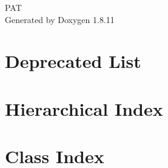 \documentclass[twoside]{book}
\newcommand{\+}{\discretionary{\mbox{\scriptsize$\hookleftarrow$}}{}{}}
\newcommand{\clearemptydoublepage}{%
  \newpage{\pagestyle{empty}\cleardoublepage}%
}
\begin{document}
\hypersetup{pageanchor=false,
             bookmarksnumbered=true,
             pdfencoding=unicode
            }
\begin{titlepage}
\vspace*{7cm}
\begin{center}%
{\Large P\+AT }\\
\vspace*{1cm}
{\large Generated by Doxygen 1.8.11}\\
\end{center}
\end{titlepage}
\clearemptydoublepage
\tableofcontents
\clearemptydoublepage
{}
\hypersetup{pageanchor=true}

\chapter{Deprecated List}
\label{deprecated}
\hypertarget{deprecated}{}

\chapter{Hierarchical Index}

\chapter{Class Index}

\end{document}

